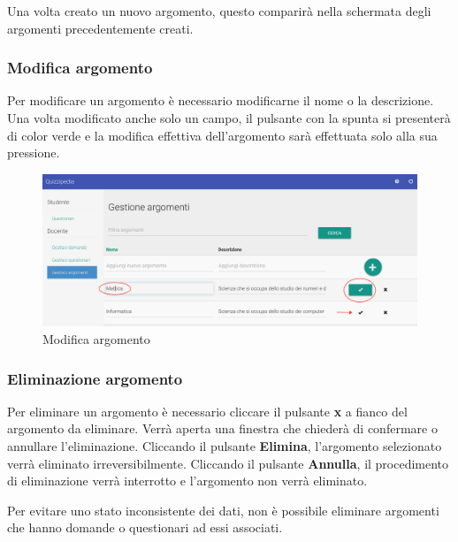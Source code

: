 \documentclass[12pt,a4paper]{article}
\begin{document}
		Una volta creato un nuovo argomento, questo comparirà nella schermata degli argomenti precedentemente creati.
		
		\subsubsection{Modifica argomento}
		\par Per modificare un argomento è necessario modificarne il nome o la descrizione. Una volta modificato anche solo un campo, il pulsante con la spunta si presenterà di color verde e la modifica effettiva dell'argomento sarà effettuata solo alla sua pressione. \\
		
			\begin{figure}[H]	
				\centering
				\includegraphics[width=1.0\linewidth]{../img/screenshot/modificaArgomento.png}
				\caption{Modifica argomento}
				\label{Modifica argomento}
			\end{figure}
		
		\subsubsection{Eliminazione argomento}
		\par Per eliminare un argomento è necessario cliccare il pulsante \textbf{x} a fianco del argomento da eliminare.
		Verrà aperta una finestra che chiederà di confermare o annullare l'eliminazione. Cliccando il pulsante \textbf{Elimina}, l'argomento selezionato verrà eliminato irreversibilmente. Cliccando il pulsante \textbf{Annulla}, il procedimento di eliminazione verrà interrotto e l'argomento non verrà eliminato. \\
		\par Per evitare uno stato inconsistente dei dati, non è possibile eliminare argomenti che hanno domande o questionari ad essi associati. \\
		
\end{document}
